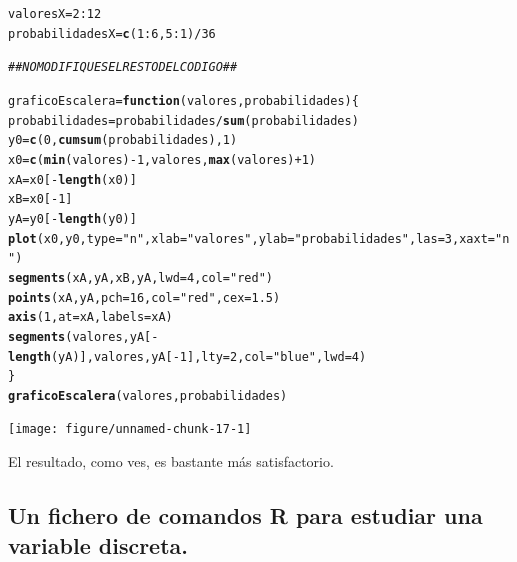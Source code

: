 \documentclass[10pt,a4paper]{article}\usepackage[]{graphicx}\usepackage[]{color}
\makeatletter
\newcommand{\hlnum}[1]{\textcolor[rgb]{0.686,0.059,0.569}{#1}}%
\newcommand{\hlstr}[1]{\textcolor[rgb]{0.192,0.494,0.8}{#1}}%
\newcommand{\hlcom}[1]{\textcolor[rgb]{0.678,0.584,0.686}{\textit{#1}}}%
\newcommand{\hlopt}[1]{\textcolor[rgb]{0,0,0}{#1}}%
\newcommand{\hlstd}[1]{\textcolor[rgb]{0.345,0.345,0.345}{#1}}%
\newcommand{\hlkwa}[1]{\textcolor[rgb]{0.161,0.373,0.58}{\textbf{#1}}}%
\newcommand{\hlkwb}[1]{\textcolor[rgb]{0.69,0.353,0.396}{#1}}%
\newcommand{\hlkwc}[1]{\textcolor[rgb]{0.333,0.667,0.333}{#1}}%
\newcommand{\hlkwd}[1]{\textcolor[rgb]{0.737,0.353,0.396}{\textbf{#1}}}%
\newenvironment{kframe}{%
 \def\at@end@of@kframe{}%
 \ifinner\ifhmode%
  \def\at@end@of@kframe{\end{minipage}}%
  \begin{minipage}{\columnwidth}%
 \fi\fi%
 \def\FrameCommand##1{\hskip\@totalleftmargin \hskip-\fboxsep
 \colorbox{shadecolor}{##1}\hskip-\fboxsep
     \hskip-\linewidth \hskip-\@totalleftmargin \hskip\columnwidth}%
 \MakeFramed {\advance\hsize-\width
   \@totalleftmargin\z@ \linewidth\hsize
   \@setminipage}}%
 {\par\unskip\endMakeFramed%
 \at@end@of@kframe}
\newenvironment{knitrout}{}{} %
\makeatother
\begin{document}
\begin{knitrout}
\color{fgcolor}\begin{kframe}
\begin{alltt}
\hlstd{valoresX} \hlkwb{=} \hlnum{2}\hlopt{:}\hlnum{12}
\hlstd{probabilidadesX} \hlkwb{=} \hlkwd{c}\hlstd{(}\hlnum{1}\hlopt{:}\hlnum{6}\hlstd{,}\hlnum{5}\hlopt{:}\hlnum{1}\hlstd{)} \hlopt{/} \hlnum{36}

\hlcom{##  NO MODIFIQUES EL RESTO DEL CODIGO ##}

\hlstd{graficoEscalera} \hlkwb{=} \hlkwa{function}\hlstd{(}\hlkwc{valores}\hlstd{,} \hlkwc{probabilidades} \hlstd{)\{}
  \hlstd{probabilidades} \hlkwb{=} \hlstd{probabilidades}\hlopt{/}\hlkwd{sum}\hlstd{(probabilidades)}
  \hlstd{y0} \hlkwb{=} \hlkwd{c}\hlstd{(}\hlnum{0}\hlstd{,}\hlkwd{cumsum}\hlstd{(probabilidades),} \hlnum{1}\hlstd{)}
  \hlstd{x0} \hlkwb{=} \hlkwd{c}\hlstd{(}\hlkwd{min}\hlstd{(valores)}\hlopt{-}\hlnum{1}\hlstd{,valores,} \hlkwd{max}\hlstd{(valores)}\hlopt{+}\hlnum{1}\hlstd{)}
  \hlstd{xA} \hlkwb{=} \hlstd{x0[}\hlopt{-}\hlkwd{length}\hlstd{(x0)]}
  \hlstd{xB} \hlkwb{=} \hlstd{x0[}\hlopt{-}\hlnum{1}\hlstd{]}
  \hlstd{yA} \hlkwb{=} \hlstd{y0[}\hlopt{-}\hlkwd{length}\hlstd{(y0)]}
  \hlkwd{plot}\hlstd{(x0, y0,} \hlkwc{type}\hlstd{=}\hlstr{"n"}\hlstd{,} \hlkwc{xlab}\hlstd{=}\hlstr{"valores"}\hlstd{,} \hlkwc{ylab}\hlstd{=}\hlstr{"probabilidades"}\hlstd{,} \hlkwc{las}\hlstd{=}\hlnum{3}\hlstd{,} \hlkwc{xaxt}\hlstd{=}\hlstr{"n"}\hlstd{)}
  \hlkwd{segments}\hlstd{(xA,yA,xB,yA,} \hlkwc{lwd}\hlstd{=}\hlnum{4}\hlstd{,} \hlkwc{col}\hlstd{=}\hlstr{"red"}\hlstd{)}
  \hlkwd{points}\hlstd{(xA, yA,} \hlkwc{pch}\hlstd{=}\hlnum{16}\hlstd{,} \hlkwc{col}\hlstd{=}\hlstr{"red"}\hlstd{,} \hlkwc{cex}\hlstd{=}\hlnum{1.5}\hlstd{)}
  \hlkwd{axis}\hlstd{(}\hlnum{1}\hlstd{,} \hlkwc{at}\hlstd{=xA,}   \hlkwc{labels}\hlstd{=xA)}
  \hlkwd{segments}\hlstd{(valores, yA[}\hlopt{-}\hlkwd{length}\hlstd{(yA)] , valores, yA[}\hlopt{-}\hlnum{1}\hlstd{],} \hlkwc{lty}\hlstd{=}\hlnum{2}\hlstd{,} \hlkwc{col}\hlstd{=}\hlstr{"blue"}\hlstd{,} \hlkwc{lwd}\hlstd{=}\hlnum{4}\hlstd{)}
\hlstd{\}}
\hlkwd{graficoEscalera}\hlstd{(valores, probabilidades)}
\end{alltt}
\end{kframe}
\texttt{[image: figure/unnamed-chunk-17-1]} 

\end{knitrout}
El resultado, como ves, es bastante más satisfactorio.

\subsection{Un fichero de comandos R para estudiar una variable discreta.}
\label{tut04:subsec:FicheroComandosRParaVaraiableDiscreta}
\end{document}
